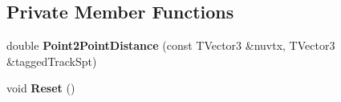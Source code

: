 \subsection*{Private Member Functions}
\begin{DoxyCompactItemize}
\item 
double {\bfseries Point2\+Point\+Distance} (const T\+Vector3 \&nuvtx, T\+Vector3 \&tagged\+Track\+Spt)\hypertarget{classselection_1_1CRTApproachSelection_a4d3cc00b6333fbdd173aed916aadb9aa}{}\label{classselection_1_1CRTApproachSelection_a4d3cc00b6333fbdd173aed916aadb9aa}

\item 
void {\bfseries Reset} ()\hypertarget{classselection_1_1CRTApproachSelection_a6a2239444e404fa929032056dddedaa7}{}\label{classselection_1_1CRTApproachSelection_a6a2239444e404fa929032056dddedaa7}

\end{DoxyCompactItemize}
